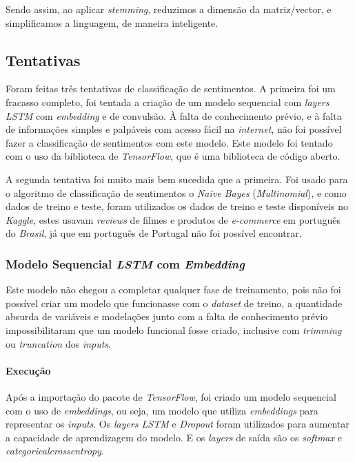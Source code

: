 Sendo assim, ao aplicar \textit{stemming}, reduzimos a dimensão da matriz/vector, e simplificamos a linguagem, de maneira inteligente.

\subsection{Tentativas}

Foram feitas três tentativas de classificação de sentimentos. A primeira foi um fracasso completo, foi tentada a criação de um modelo sequencial com \textit{layers LSTM} com \textit{embedding} e de convulsão. À falta de conhecimento prévio, e à falta de informações simples e palpáveis com acesso fácil na \textit{internet}, não foi possível fazer a classificação de sentimentos com este modelo. Este modelo foi tentado com o uso da biblioteca de \textit{TensorFlow}, que é uma biblioteca de código aberto.

A segunda tentativa foi muito mais bem sucedida que a primeira. Foi usado para o algoritmo de classificação de sentimentos o \textit{Naïve Bayes} (\textit{Multinomial}), e como dados de treino e teste, foram utilizados os dados de treino e teste disponíveis no \textit{Kaggle}, estes usavam \textit{reviews} de filmes e produtos de \textit{e-commerce} em português do \textit{Brasil}, já que em português de Portugal não foi possível encontrar.

\subsubsection{Modelo Sequencial \textit{LSTM} com \textit{Embedding}}

Este modelo não chegou a completar qualquer fase de treinamento, pois não foi possível criar um modelo que funcionasse com o \textit{dataset} de treino, a quantidade absurda de variáveis e modelações junto com a falta de conhecimento prévio impossibilitaram que um modelo funcional fosse criado, inclusive com \textit{trimming} ou \textit{truncation} dos \textit{inputs}.

\paragraph{Execução\\}

Após a importação do pacote de \textit{TensorFlow}, foi criado um modelo sequencial com o uso de \textit{embeddings}, ou seja, um modelo que utiliza \textit{embeddings} para representar os \textit{inputs}. Os \textit{layers LSTM} e \textit{Dropout} foram utilizados para aumentar a capacidade de aprendizagem do modelo. E os \textit{layers} de saída são os \textit{softmax} e \textit{categorical\textunderscore crossentropy}.

